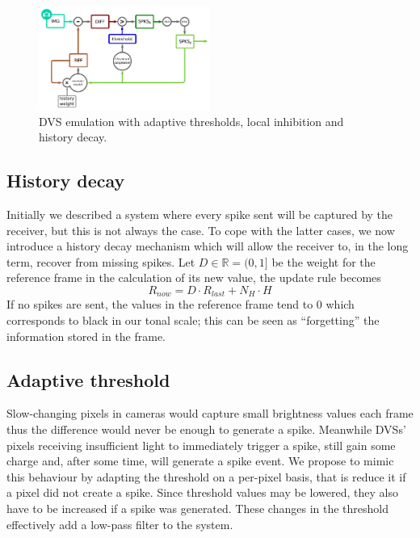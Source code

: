 \documentclass[conference]{IEEEtran}
\begin{document}
\begin{figure}[htb]
  
  \includegraphics[width=0.5\textwidth]{dvs_emu_decay_adapt_inh}
  \caption{DVS emulation with adaptive thresholds, local inhibition and history decay.}
  \label{fig:dvs_emu_inh}
\end{figure}

\subsection{History decay} %

Initially we described a system where every spike sent will be captured by the receiver, but this is not always the case. To cope with the latter cases, we now introduce a history decay mechanism which will allow the receiver to, in the long term, recover from missing spikes. Let $D \in \mathbb{R} = (0, 1]$ be the weight for the reference frame in the calculation of its new value, the update rule becomes
\begin{equation}
\label{eq:ref_update_decay}
R_{now} = D\cdot R_{last} + N_{H}\cdot H
\end{equation}
If no spikes are sent, the values in the reference frame tend to 0 which corresponds to black in our tonal scale; this can be seen as ``forgetting'' the information stored in the frame.
%

\subsection{Adaptive threshold} 
Slow-changing pixels in cameras would capture small brightness values each frame thus the difference would never be enough to generate a spike. Meanwhile DVSs' pixels receiving insufficient light to immediately trigger a spike, still gain some charge and, after some time, will generate a spike event. We propose to mimic this behaviour by adapting the threshold on a per-pixel basis, that is reduce it if a pixel did not create a spike. Since threshold values may be lowered, they also have to be increased if a spike was generated. These changes in the threshold effectively add a low-pass filter to the system. 
\end{document}
